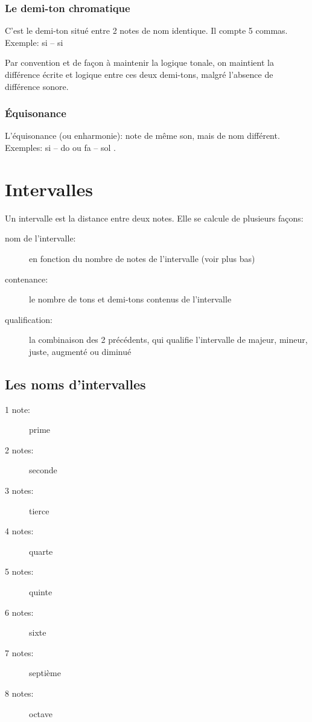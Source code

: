 \documentclass[11pt]{scrreprt}
\begin{document}
\subsubsection{Le demi-ton chromatique}
C'est le demi-ton situé entre 2 notes de nom identique. Il compte 5 commas. Exemple: si -- si \flat


Par convention et de façon à maintenir la logique tonale, on maintient la différence écrite et logique entre ces deux demi-tons, malgré l'absence de différence sonore.
\subsubsection{Équisonance}
L'équisonance (ou enharmonie): note de même son, mais de nom différent. Exemples: si -- do \flat{} ou fa \sharp{} -- sol \flat.

\section{Intervalles}
Un intervalle est la distance entre deux notes. Elle se calcule de plusieurs façons:
\begin{description}
\item[nom de l'intervalle:] en fonction du nombre de notes de l'intervalle (voir plus bas) 
\item[contenance:] le nombre de tons et demi-tons contenus de l'intervalle
\item[qualification:] la combinaison des 2 précédents, qui qualifie l'intervalle de majeur, mineur, juste, augmenté ou diminué
\end{description}
\subsection{Les noms d'intervalles}
\begin{description}
\item [1 note:] prime
\item [2 notes:] seconde
\item [3 notes:] tierce
\item [4 notes:] quarte
\item [5 notes:] quinte
\item [6 notes:] sixte
\item [7 notes:] septième
\item [8 notes:] octave
\end{description}
\end{document}
